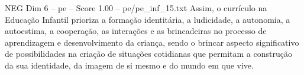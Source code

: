 \begin{textsample}{NEG Dim 6 – pe – Score 1.00 – pe/pe\_inf\_15.txt}
Assim, o currículo na Educação Infantil prioriza a formação identitária, a ludicidade, a autonomia, a autoestima, a cooperação, as interações e as brincadeiras no processo de aprendizagem e desenvolvimento da criança, sendo o brincar aspecto significativo de possibilidades na criação de situações cotidianas que permitam a construção da sua identidade, da imagem de si mesmo e do mundo em que vive.

\end{textsample}

